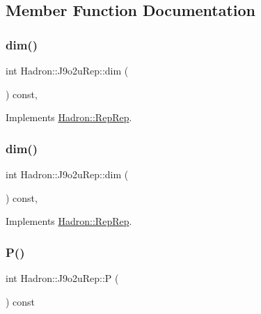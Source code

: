 \subsection{Member Function Documentation}
\mbox{\label{structHadron_1_1J9o2uRep_a8fe53f7193e81fb4681c5adbf89bca09}} 
\subsubsection{\texorpdfstring{dim()}{dim()}\hspace{0.1cm}{\footnotesize\ttfamily [1/2]}}
{\footnotesize\ttfamily int Hadron\+::\+J9o2u\+Rep\+::dim (\begin{DoxyParamCaption}{ }\end{DoxyParamCaption}) const\hspace{0.3cm}{\ttfamily [inline]}, {\ttfamily [virtual]}}



Implements \mbox{\hyperlink{structHadron_1_1RepRep_a92c8802e5ed7afd7da43ccfd5b7cd92b}{Hadron\+::\+Rep\+Rep}}.

\mbox{\label{structHadron_1_1J9o2uRep_a8fe53f7193e81fb4681c5adbf89bca09}} 
\subsubsection{\texorpdfstring{dim()}{dim()}\hspace{0.1cm}{\footnotesize\ttfamily [2/2]}}
{\footnotesize\ttfamily int Hadron\+::\+J9o2u\+Rep\+::dim (\begin{DoxyParamCaption}{ }\end{DoxyParamCaption}) const\hspace{0.3cm}{\ttfamily [inline]}, {\ttfamily [virtual]}}



Implements \mbox{\hyperlink{structHadron_1_1RepRep_a92c8802e5ed7afd7da43ccfd5b7cd92b}{Hadron\+::\+Rep\+Rep}}.

\mbox{\label{structHadron_1_1J9o2uRep_a3aebae1f874d8463e884f81517de21a8}} 
\subsubsection{\texorpdfstring{P()}{P()}\hspace{0.1cm}{\footnotesize\ttfamily [1/2]}}
{\footnotesize\ttfamily int Hadron\+::\+J9o2u\+Rep\+::P (\begin{DoxyParamCaption}{ }\end{DoxyParamCaption}) const\hspace{0.3cm}{\ttfamily [inline]}}

